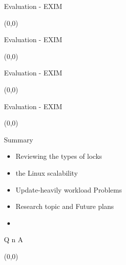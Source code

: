 \documentclass[english]{beamer} %
\begin{document}
\begin{frame}{Evaluation - EXIM}
\begin{textblock}{1}(0,0)
\end{textblock}
\end{frame}

\begin{frame}{Evaluation - EXIM}
\begin{textblock}{1}(0,0)
\end{textblock}
\end{frame}

\begin{frame}{Evaluation - EXIM}
\begin{textblock}{1}(0,0)
\end{textblock}
\end{frame}


\begin{frame}{Evaluation - EXIM}
\begin{textblock}{1}(0,0)
\end{textblock}
\end{frame}

\begin{frame}{Summary}
	\begin{itemize}
	\item Reviewing the types of locks
	\item the Linux scalability
	\item Update-heavily workload Problems
	\item Research topic and Future plans
	\item {}
	\end{itemize}
\end{frame}


\begin{frame}{Q n A}
\begin{textblock}{1}(0,0)
\end{textblock}
\end{frame}
\end{document}

